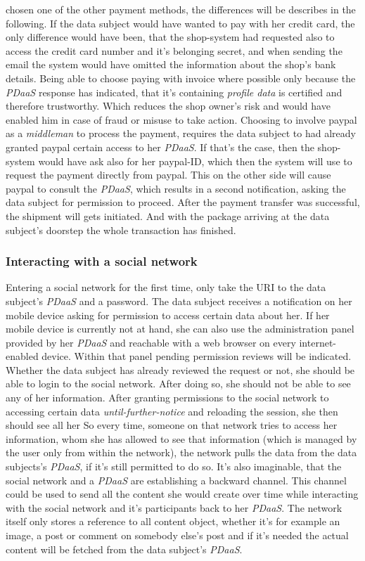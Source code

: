 \documentclass[12pt,english,a4paper,titlepage,cleardoublepage=empty,dottedtoc]{report}
\begin{document}
chosen one of the other payment methods, the differences will be
describes in the following. If the data subject would have wanted to pay
with her credit card, the only difference would have been, that the
shop-system had requested also to access the credit card number and it's
belonging secret, and when sending the email the system would have
omitted the information about the shop's bank details. Being able to
choose paying with invoice where possible only because the \emph{PDaaS}
response has indicated, that it's containing \emph{profile data} is
certified and therefore trustworthy. Which reduces the shop owner's risk
and would have enabled him in case of fraud or misuse to take action.
Choosing to involve paypal as a \emph{middleman} to process the payment,
requires the data subject to had already granted paypal certain access
to her \emph{PDaaS}. If that's the case, then the shop-system would have
ask also for her paypal-ID, which then the system will use to request
the payment directly from paypal. This on the other side will cause
paypal to consult the \emph{PDaaS}, which results in a second
notification, asking the data subject for permission to proceed. After
the payment transfer was successful, the shipment will gets initiated.
And with the package arriving at the data subject's doorstep the whole
transaction has finished.

\subsubsection{Interacting with a social
network}\label{interacting-with-a-social-network}

Entering a social network for the first time, only take the URI to the
data subject's \emph{PDaaS} and a password. The data subject receives a
notification on her mobile device asking for permission to access
certain data about her. If her mobile device is currently not at hand,
she can also use the administration panel provided by her \emph{PDaaS}
and reachable with a web browser on every internet-enabled device.
Within that panel pending permission reviews will be indicated. Whether
the data subject has already reviewed the request or not, she should be
able to login to the social network. After doing so, she should not be
able to see any of her information. After granting permissions to the
social network to accessing certain data \emph{until-further-notice} and
reloading the session, she then should see all her So every time,
someone on that network tries to access her information, whom she has
allowed to see that information (which is managed by the user only from
within the network), the network pulls the data from the data subjects's
\emph{PDaaS}, if it's still permitted to do so. It's also imaginable,
that the social network and a \emph{PDaaS} are establishing a backward
channel. This channel could be used to send all the content she would
create over time while interacting with the social network and it's
participants back to her \emph{PDaaS}. The network itself only stores a
reference to all content object, whether it's for example an image, a
post or comment on somebody else's post and if it's needed the actual
content will be fetched from the data subject's \emph{PDaaS}.
\end{document}
